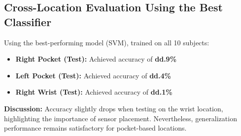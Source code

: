 \documentclass[runningheads]{llncs}
\begin{document}
\subsection{Cross-Location Evaluation Using the Best Classifier}

Using the best-performing model (SVM), trained on all 10 subjects:

\begin{itemize}
    \item \textbf{Right Pocket (Test):} Achieved accuracy of \textbf{dd.9\%}
    \item \textbf{Left Pocket (Test):} Achieved accuracy of \textbf{dd.4\%}
    \item \textbf{Right Wrist (Test):} Achieved accuracy of \textbf{dd.1\%}
\end{itemize}

\textbf{Discussion:} Accuracy slightly drops when testing on the wrist location, highlighting the importance of sensor placement. Nevertheless, generalization performance remains satisfactory for pocket-based locations.






\end{document}
